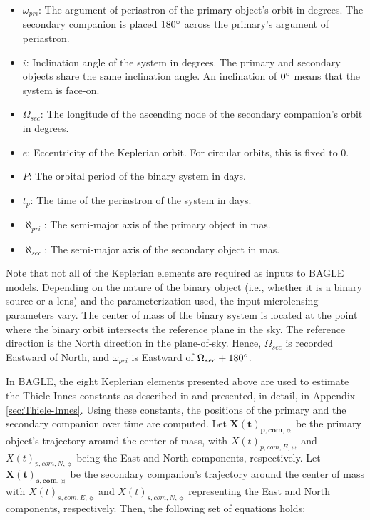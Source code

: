 \documentclass[twocolumn]{aastex701}
\newcommand{\vect}[1]{\boldsymbol{#1}}
\newcommand{\Xcomp}{\vect{X(t)}_{\boldsymbol{p},\boldsymbol{com},\sun}}
\newcommand{\Xcoms}{\vect{X(t)}_{\boldsymbol{s},\boldsymbol{com},\sun}}
\newcommand{\Xcomep}{{X(t)}_{{p, {com}, E},\sun}}
\newcommand{\Xcomnp}{{X(t)}_{{p, {com}, N},\sun}}
\newcommand{\Xcomes}{{X(t)}_{{s, {com}, E},\sun}}
\newcommand{\Xcomns}{{X(t)}_{{s, {com}, N},\sun}}
\newcommand{\w}{\omega_{pri}}
\newcommand{\bigomega}{\Omega_{sec}}
\newcommand{\inclination}{\textit{i}}
\newcommand{\eccentricity}{\textit{e}}
\newcommand{\period}{\textit{P}}
\newcommand{\al}{\aleph_{pri}}
\newcommand{\ala}{\aleph_{sec}}
\begin{document}
\begin{itemize}
\label{keplerian_elems}
    \item $\w$: The argument of periastron of the primary object's orbit in degrees. The secondary companion is placed $180 \degree$ across the primary's argument of periastron. 
    \item $\inclination$: Inclination angle of the system in degrees. The primary and secondary objects share the same inclination angle.  An inclination of $0\degree$ means that the system is face-on.
    \item $\bigomega$: The longitude of the ascending node of the secondary companion's orbit in degrees. 
    \item $\eccentricity$: Eccentricity of the Keplerian orbit. For circular orbits, this is fixed to 0. 
    \item $\period$: The orbital period of the binary system in days. 
    \item $t_p$: The time of the periastron of the system in days. 
    \item $\al$: The semi-major axis of the primary object in mas.
    \item $\ala$: The semi-major axis of the secondary object in mas. 
\end{itemize}

Note that not all of the Keplerian elements are required as inputs to BAGLE models. Depending on the nature of the binary object (i.e., whether it is a binary source or a lens) and the parameterization used, the input microlensing parameters vary. The center of mass of the binary system is located at the point where the binary orbit intersects the reference plane in the sky.
The reference direction is the North direction in the plane-of-sky. Hence, $\bigomega$ is recorded Eastward of North, and $\w$ is Eastward of $\bigomega + 180 \degree$. 

In BAGLE, the eight Keplerian elements presented above are used to estimate the Thiele-Innes constants as described in \citet{Koren_2016} and presented, in detail, in Appendix \ref{sec:Thiele-Innes}. Using these constants, the positions of the primary and the secondary companion over time are computed. Let  $\Xcomp$ be the primary object's trajectory around the center of mass, with $\Xcomep$ and  $\Xcomnp$ being the East and North components, respectively. Let  $\Xcoms$ be the secondary companion's trajectory around the center of mass with $\Xcomes$ and  $\Xcomns$ representing the East and North components, respectively. Then, the following set of equations holds: 
\end{document}
